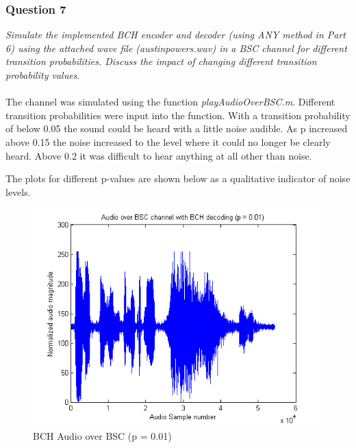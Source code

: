 \documentclass[a4paper]{article}
\begin{document}
\subsubsection{Question 7} \textit{Simulate the implemented BCH encoder and decoder (using ANY method in Part 6) using the attached wave file (austinpowers.wav) in a BSC channel for different transition probabilities. Discuss the impact of changing different transition probability values.}\\
\\
The channel was simulated using the function \textit{playAudioOverBSC.m}. Different transition probabilities were input into the function. With a transition probability of below 0.05 the sound could be heard with a little noise audible. As p increased above 0.15 the noise increased to the level where it could no longer be clearly heard. Above 0.2 it was difficult to hear anything at all other than noise.

The plots for different p-values are shown below as a qualitative indicator of noise levels.

\begin{figure}[H]
\centering
\includegraphics[scale=0.5]{plots/audio_over_bsc_bch_p_001.png}
\caption{BCH Audio over BSC (p = 0.01)}
\end{figure}
\end{document}
